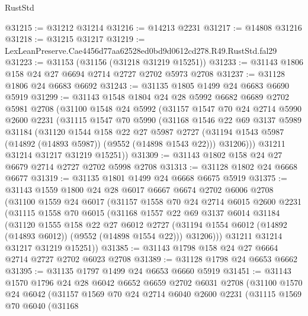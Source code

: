\begin{lexlean}{RustStd}
\begin{coremodule}
@31215 := @31212 @31214
@31216 := @14213 @2231
@31217 := @14808 @31216
@31218 := @31215 @31217
@31219 := LexLeanPreserve.Cae4456d77aa62528ed0bd9d0612cd278.R49.RustStd.fal29
@31223 := @31153 (@31156 (@31218 @31219 @15251))
@31233 := @31143 @1806 @158 @24 @27 @6694 @2714 @2727 @2702 @5973 @2708
@31237 := @31128 @1806 @24 @6683 @6692
@31243 := @31135 @1805 @1499 @24 @6683 @6690 @5919
@31299 := @31143
    @1548
    @1804
    @24
    @28
    @5992
    @6682
    @6689
    @2702
    @5981
    @2708
    (@31100
      @1548
      @24
      @5992
      (@31157
        @1547
        @70
        @24
        @2714
        @5990
        @2600
        @2231
        (@31115
          @1547
          @70
          @5990
          (@31168
            @1546
            @22
            @69
            @3137
            @5989
            @31184
            (@31120
              @1544
              @158
              @22
              @27
              @5987
              @2727
              (@31194 @1543 @5987 (@14892 (@14893 @5987)) (@9552 (@14898 @1543 @22)))
              @31206)))
        @31211
        @31214
        @31217
        @31219
        @15251))
@31309 := @31143 @1802 @158 @24 @27 @6679 @2714 @2727 @2702 @5998 @2708
@31313 := @31128 @1802 @24 @6668 @6677
@31319 := @31135 @1801 @1499 @24 @6668 @6675 @5919
@31375 := @31143
    @1559
    @1800
    @24
    @28
    @6017
    @6667
    @6674
    @2702
    @6006
    @2708
    (@31100
      @1559
      @24
      @6017
      (@31157
        @1558
        @70
        @24
        @2714
        @6015
        @2600
        @2231
        (@31115
          @1558
          @70
          @6015
          (@31168
            @1557
            @22
            @69
            @3137
            @6014
            @31184
            (@31120
              @1555
              @158
              @22
              @27
              @6012
              @2727
              (@31194 @1554 @6012 (@14892 (@14893 @6012)) (@9552 (@14898 @1554 @22)))
              @31206)))
        @31211
        @31214
        @31217
        @31219
        @15251))
@31385 := @31143 @1798 @158 @24 @27 @6664 @2714 @2727 @2702 @6023 @2708
@31389 := @31128 @1798 @24 @6653 @6662
@31395 := @31135 @1797 @1499 @24 @6653 @6660 @5919
@31451 := @31143
    @1570
    @1796
    @24
    @28
    @6042
    @6652
    @6659
    @2702
    @6031
    @2708
    (@31100
      @1570
      @24
      @6042
      (@31157
        @1569
        @70
        @24
        @2714
        @6040
        @2600
        @2231
        (@31115
          @1569
          @70
          @6040
          (@31168

\end{coremodule}
\end{lexlean}
